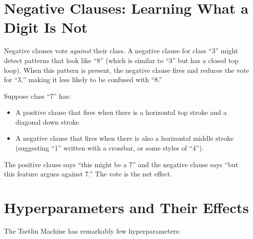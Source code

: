 \section{Negative Clauses: Learning What a Digit Is Not}
\label{sec:negative-clauses}

Negative clauses vote \emph{against} their class. A negative clause
for class ``3'' might detect patterns that look like ``8'' (which is
similar to ``3'' but has a closed top loop). When this pattern is
present, the negative clause fires and reduces the vote for ``3,''
making it less likely to be confused with ``8.''

\begin{example}
Suppose class ``7'' has:
\begin{itemize}
  \item A positive clause that fires when there is a horizontal top
    stroke and a diagonal down stroke.
  \item A negative clause that fires when there is also a horizontal
    middle stroke (suggesting ``1'' written with a crossbar, or
    some styles of ``4'').
\end{itemize}
The positive clause says ``this might be a 7'' and the negative clause
says ``but this feature argues against 7.'' The vote is the net
effect.
\end{example}


\section{Hyperparameters and Their Effects}
\label{sec:hyperparams}

The Tsetlin Machine has remarkably few hyperparameters:

